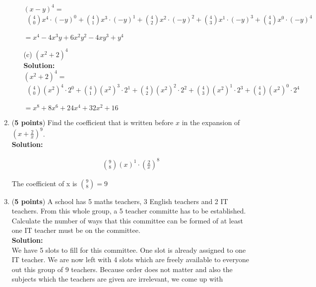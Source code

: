 \documentclass[a4paper]{article}
\begin{document}
\begin{enumerate}
\begin{enumerate}
$(x-y)^4 =$	
	\begin{align*}
	{4 \choose 0}x^4 \cdot (-y)^0 + {4 \choose 1}x^3 \cdot (-y)^1 + {4 \choose 2}x^2 \cdot (-y)^2 + {4 \choose 3}x^1 \cdot (-y)^3 + {4 \choose 4}x^0 \cdot (-y)^4
	\end{align*}

$= x^4 - 4x^3y + 6x^2y^2 -4xy^3 + y^4$\\
	
	\item[(c)] $(x^2 + 2)^4$\\
	\textbf{Solution:}\\

$(x^2+2)^4 =$	
	\begin{align*}
	{4 \choose 0}(x^2)^4 \cdot 2^0 + {4 \choose 1}(x^2)^3 \cdot 2^1 + {4 \choose 2}(x^2)^2 \cdot 2^2 + {4 \choose 3}(x^2)^1 \cdot 2^3 + {4 \choose 4}(x^2)^0 \cdot 2^4
	\end{align*}

$= x^8 + 8x^6 + 24x^4 + 32x^2 + 16$\\	
	
\end{enumerate}	
	
	
	
\item (\textbf{5 points}) Find the coefficient that is written before $x$ in the expansion of $(x + \frac{2}{x})^9$.\\
\textbf{Solution:}
	
\begin{align*}
	{9 \choose 8}(x)^1 \cdot (\frac{2}{x})^8
\end{align*}	
	
The coefficient of x is ${9 \choose 8} = 9$\\	
	
	
\item (\textbf{5 points}) A school has 5 maths teachers, 3 English teachers and 2 IT teachers. From this whole group, a 5 teacher committe has to be established. Calculate the number of ways that this committee can be formed of at least one IT teacher must be on the committee.\\
\textbf{Solution:}\\


We have 5 slots to fill for this committee. One slot is already assigned to one IT teacher. We are now left with 4 slots which are freely available to everyone out this group of 9 teachers. Because order does not matter and also the subjects which the teachers are given are irrelevant, we come up with


\end{enumerate}
\end{document}
